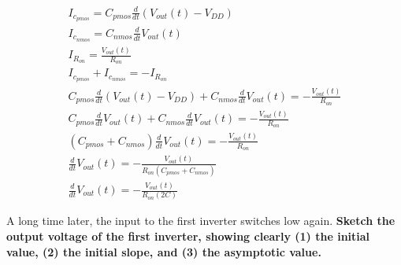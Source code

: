 \begin{enumerate}
{\begin{align*}
I_{c_{pmos}} = C_{pmos} \frac{d}{dt}(V_{out}(t) - V_{DD}) \\
I_{c_{nmos}} = C_{nmos} \frac{d}{dt}V_{out}(t) \\
I_{R_{on}} = \frac{V_{out}(t)}{R_{on}} \\
I_{c_{pmos}} + I_{c_{nmos}} = -I_{R_{on}} \\
C_{pmos} \frac {d}{dt} (V_{out}(t) - V_{DD}) + C_{nmos} \frac {d}{dt} V_{out}(t) = - \frac {V_{out}(t)}{R_{on}} \\
C_{pmos} \frac {d}{dt} V_{out}(t) + C_{nmos} \frac{d}{dt} V_{out}(t) = - \frac {V_{out} (t)} {R_{on}} \\
(C_{pmos} + C_{nmos}) \frac {d}{dt} V_{out} (t) = - \frac {V_{out}(t)} {R_{on}} \\
\frac {d}{dt} V_{out}(t) = - \frac {V_{out} (t)} {R_{on} (C_{pmos} + C_{nmos})} \\
\frac {d}{dt} V_{out} (t) = - \frac {V_{out} (t)} {R_{on} (2C)}
\end{align*}
}

\qitem A long time later, the input to the first inverter switches low again. \textbf{Sketch the output voltage of the first inverter, showing clearly (1) the initial value, (2) the initial slope, and (3) the asymptotic value.}


\end{enumerate}
